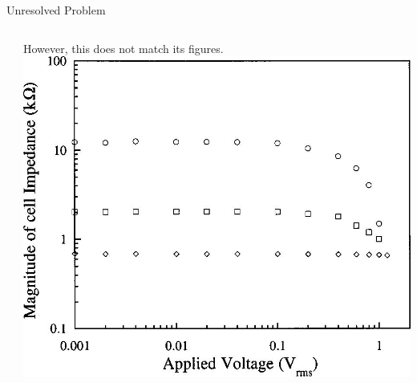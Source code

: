\documentclass[12pt]{beamer}
\begin{document}
\begin{frame}{Unresolved Problem}
\begin{columns}[onlytextwidth]
\begin{column}{0.35\textwidth}
        \end{column}
        \begin{column}{0.55\textwidth}
            However, this does not match its figures.
            \includegraphics[width=\columnwidth]{6.jpg}
        \end{column}
    \end{columns}
\end{frame}
\end{document}

